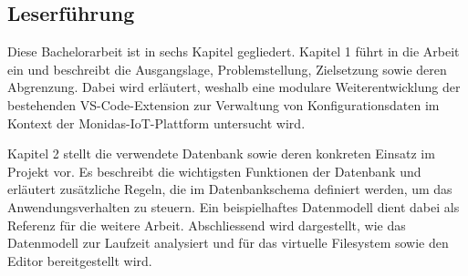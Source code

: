 \subsection{Leserführung}

Diese Bachelorarbeit ist in sechs Kapitel gegliedert. Kapitel 1 führt in die Arbeit ein und beschreibt die Ausgangslage, Problemstellung, Zielsetzung sowie deren Abgrenzung. Dabei wird erläutert, weshalb eine modulare Weiterentwicklung der bestehenden VS-Code-Extension zur Verwaltung von Konfigurationsdaten im Kontext der Monidas-IoT-Plattform untersucht wird.

Kapitel 2 stellt die verwendete Datenbank sowie deren konkreten Einsatz im Projekt vor. Es beschreibt die wichtigsten Funktionen der Datenbank und erläutert zusätzliche Regeln, die im Datenbankschema definiert werden, um das Anwendungsverhalten zu steuern. Ein beispielhaftes Datenmodell dient dabei als Referenz für die weitere Arbeit. Abschliessend wird dargestellt, wie das Datenmodell zur Laufzeit analysiert und für das virtuelle Filesystem sowie den Editor bereitgestellt wird.
